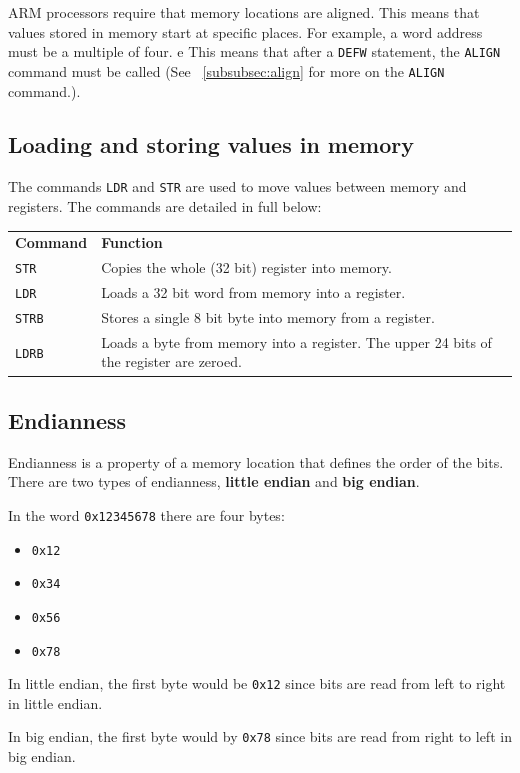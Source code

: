 ARM processors require that memory locations are aligned. This means that values
stored in memory start at specific places. For example, a word address must be a
multiple of four.
e
This means that after a {\tt DEFW} statement, the {\tt ALIGN} command must be
called (See ~\ref{subsubsec:align} for more on the {\tt ALIGN} command.).

\subsection{Loading and storing values in memory}

The commands {\tt LDR} and {\tt STR} are used to move values between memory and
registers. The commands are detailed in full below:

\begin{tabularx}{\textwidth}{l X}
	{\bf Command} & {\bf Function}\\
	{\tt STR} & Copies the whole (32 bit) register into memory.\\
	{\tt LDR} & Loads a 32 bit word from memory into a register.\\
	{\tt STRB} & Stores a single 8 bit byte into memory from a register.\\
	{\tt LDRB} & Loads a byte from memory into a register. The upper 24 bits of
	the register are zeroed.\\
\end{tabularx}

\subsection{Endianness}

Endianness is a property of a memory location that defines the order of the
bits. There are two types of endianness, {\bf little endian} and {\bf big
endian}.

In the word {\tt 0x12345678} there are four bytes:
\begin{itemize}
	\item {\tt 0x12}
	\item {\tt 0x34}
	\item {\tt 0x56}
	\item {\tt 0x78}
\end{itemize}

In little endian, the first byte would be {\tt 0x12} since bits are read from
left to right in little endian.

In big endian, the first byte would by {\tt 0x78} since bits are read from right
to left in big endian.

